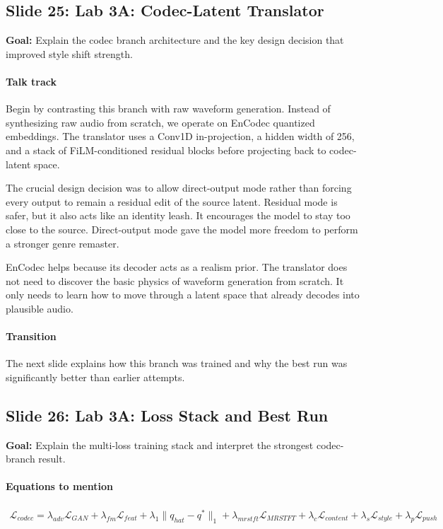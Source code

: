 \documentclass[11pt]{article}
\begin{document}
\subsection*{Slide 25: Lab 3A: Codec-Latent Translator}
\textbf{Goal:} Explain the codec branch architecture and the key design decision that improved style shift strength.
\paragraph{Talk track}
Begin by contrasting this branch with raw waveform generation. Instead of synthesizing raw audio from scratch, we operate on EnCodec quantized embeddings. The translator uses a Conv1D in-projection, a hidden width of 256, and a stack of FiLM-conditioned residual blocks before projecting back to codec-latent space.

The crucial design decision was to allow direct-output mode rather than forcing every output to remain a residual edit of the source latent. Residual mode is safer, but it also acts like an identity leash. It encourages the model to stay too close to the source. Direct-output mode gave the model more freedom to perform a stronger genre remaster.

EnCodec helps because its decoder acts as a realism prior. The translator does not need to discover the basic physics of waveform generation from scratch. It only needs to learn how to move through a latent space that already decodes into plausible audio.

\paragraph{Transition}
The next slide explains how this branch was trained and why the best run was significantly better than earlier attempts.

\subsection*{Slide 26: Lab 3A: Loss Stack and Best Run}
\textbf{Goal:} Explain the multi-loss training stack and interpret the strongest codec-branch result.
\paragraph{Equations to mention}
\begin{align*}
\mathcal{L}_{codec}=\lambda_{adv}\mathcal{L}_{GAN}+\lambda_{fm}\mathcal{L}_{feat}+\lambda_1\|q_{hat}-q^*\|_1+\lambda_{mrstft}\mathcal{L}_{MRSTFT}+\lambda_c\mathcal{L}_{content}+\lambda_s\mathcal{L}_{style}+\lambda_p\mathcal{L}_{push}
\end{align*}
\end{document}
